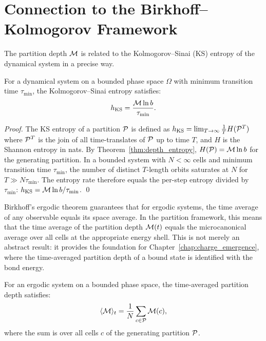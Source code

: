\section{Connection to the Birkhoff--Kolmogorov Framework}
\label{sec:birkhoff_kolmogorov}

The partition depth $\mathcal{M}$ is related to the Kolmogorov--Sinai (KS) entropy
of the dynamical system in a precise way.

\begin{proposition}
\label{prop:ks_entropy}
For a dynamical system on a bounded phase space $\Omega$ with minimum transition
time $\tau_{\min}$, the Kolmogorov--Sinai entropy satisfies:
\begin{equation}
  h_{\mathrm{KS}} = \frac{\mathcal{M} \ln b}{\tau_{\min}}.
  \label{eq:ks_entropy_rate}
\end{equation}
\end{proposition}

\begin{proof}
The KS entropy of a partition $\mathcal{P}$ is defined as
$h_{\mathrm{KS}} = \lim_{T\to\infty} \frac{1}{T} H(\mathcal{P}^T)$
where $\mathcal{P}^T$ is the join of all time-translates of $\mathcal{P}$ up to time $T$,
and $H$ is the Shannon entropy in nats. By Theorem~\ref{thm:depth_entropy},
$H(\mathcal{P}) = \mathcal{M} \ln b$ for the generating partition. In a bounded system
with $N < \infty$ cells and minimum transition time $\tau_{\min}$, the number
of distinct $T$-length orbits saturates at $N$ for $T \gg N\tau_{\min}$.
The entropy rate therefore equals the per-step entropy divided by $\tau_{\min}$:
$h_{\mathrm{KS}} = \mathcal{M} \ln b / \tau_{\min}$. \qed
\end{proof}

Birkhoff's ergodic theorem guarantees that for ergodic systems, the time
average of any observable equals its space average. In the partition framework,
this means that the time average of the partition depth $\mathcal{M}(t)$ equals
the microcanonical average over all cells at the appropriate energy shell.
This is not merely an abstract result: it provides the foundation for
Chapter~\ref{chap:charge_emergence}, where the time-averaged partition depth
of a bound state is identified with the bond energy.

\begin{proposition}
\label{prop:birkhoff_depth}
For an ergodic system on a bounded phase space, the time-averaged partition
depth satisfies:
\begin{equation}
  \langle \mathcal{M} \rangle_t = \frac{1}{N} \sum_{c \in \mathcal{P}} \mathcal{M}(c),
  \label{eq:birkhoff_depth}
\end{equation}
where the sum is over all cells $c$ of the generating partition $\mathcal{P}$.
\end{proposition}

